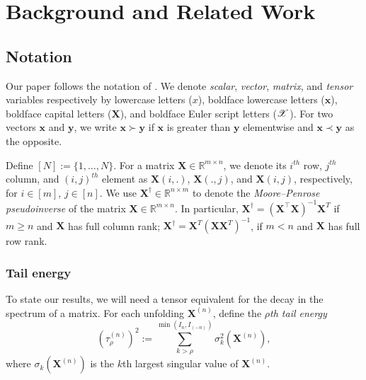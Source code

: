 \section{Background and Related Work}

\subsection{Notation}
Our paper follows the notation of \cite{kolda2009tensor}.
We denote \textit{scalar}, \textit{vector}, \textit{matrix}, and \textit{tensor} variables
respectively by lowercase letters ($x$), boldface lowercase letters ($\mathbf{x}$),
boldface capital letters  ($\mathbf{X}$),  and boldface Euler script letters ($\T{X}$).
For two vectors $\mathbf{x}$ and $\mathbf{y}$,
we write $\mathbf{x} \succ \mathbf{y}$ if $\mathbf{x}$ is greater than $\mathbf{y}$ elementwise and $\mathbf{x} \prec \mathbf{y}$ as the opposite. 

Define $[N] := \{1,\dots, N\}$.
For a matrix $\mathbf{X} \in \mathbb{R}^{m \times n}$,
we denote its $i^{th}$ row, $j^{th}$ column,
and $(i,j)^{th}$ element
as $\mathbf{X}(i,.)$, $\mathbf{X}(.,j)$, and $\mathbf{X}(i,j)$, respectively,
for $i \in [m]$, $j \in [n]$.
We use $\mathbf{X}^\dag \in \mathbb{R}^{n \times m}$ to denote the
\textit{Moore--Penrose pseudoinverse} of the matrix $\mathbf{X} \in \mathbb{R}^{m \times n}$.
In particular, $\mathbf{X}^\dag = (\mathbf{X}^\top \mathbf{X})^{-1}\mathbf{X}^T$
if $m \geq n$ and $\mathbf{X}$ has full column rank;
$\mathbf{X}^\dag = \mathbf{X}^T(\mathbf{XX}^T)^{-1}$,
if $m < n$ and $\mathbf{X}$ has full row rank. 

\subsubsection{Tail energy}
To state our results, we will need a tensor equivalent for the decay in the
spectrum of a matrix.
For each unfolding $\mathbf{X}^{(n)}$,
define the $\rho$\textit{th tail energy}
\begin{equation}
(\tau_\rho^{(n)})^2 := \sum_{k>\rho}^{\min(I_n,I_{(-n)})} \sigma_{k}^2(\mathbf{X}^{(n)}), \nonumber
\end{equation}
where $\sigma_{k}(\mathbf{X}^{(n)})$ is the $k$th largest singular value of $\mathbf{X}^{(n)}$.



